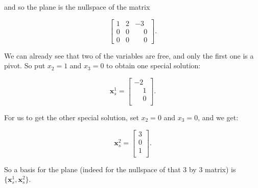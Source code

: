 \documentclass{article}
\begin{document}
and so the plane is the nullspace of the matrix

\[
\begin{bmatrix}
1 & 2 & -3\\
0 & 0 & \phantom{-}0\\
0 & 0 & \phantom{-}0
\end{bmatrix}.
\]

We can already see that two of the variables are free, and only the first one is a pivot. So put $x_2 = 1$ and $x_3 = 0$ to obtain one special solution:

\[
\mathbf{x}_{s}^{1} = \begin{bmatrix}
-2\\
\phantom{-}1\\
\phantom{-}0\\
\end{bmatrix}.
\]

For us to get the other special solution, set $x_2 = 0$ and $x_3 = 0$, and we get:

\[
\mathbf{x}_{s}^{2} = \begin{bmatrix}
3\\
0\\
1\\
\end{bmatrix}.
\]

So a basis for the plane (indeed for the nullspace of that 3 by 3 matrix) is $\{\mathbf{x}_{s}^{1}, \mathbf{x}_{s}^{2}\}$.
\end{document}
